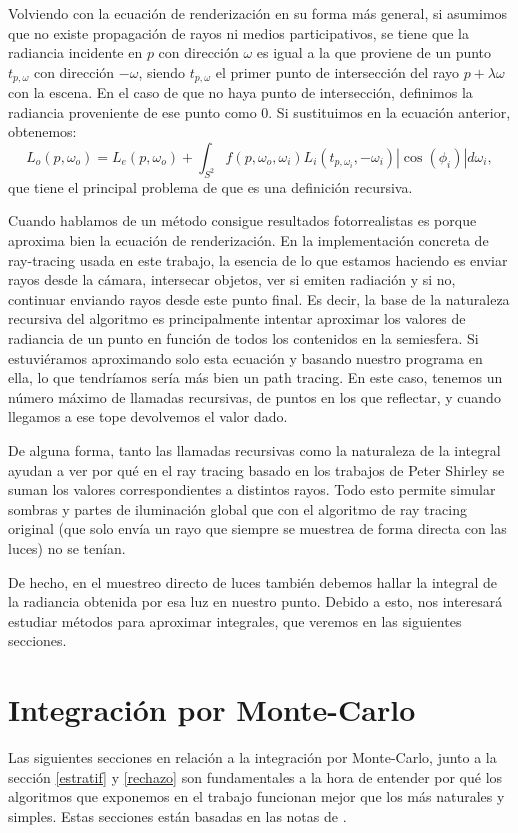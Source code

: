 \documentclass{scrbook}
\begin{document}
Volviendo con la ecuación de renderización en su forma más general, si asumimos que no existe propagación de rayos ni medios participativos, se tiene que la radiancia incidente en $p$ con dirección $\omega$ es igual a la que proviene de un punto $t_{p,\omega}$ con dirección $-\omega$, siendo $t_{p,\omega}$ el primer punto de intersección del rayo $p+\lambda \omega$ con la escena. En el caso de que no haya punto de intersección, definimos la radiancia proveniente de ese punto como $0$. Si sustituimos en la ecuación anterior, obtenemos:
$$L_o(p, \omega_o) = L_e(p, \omega_o) + \int_{S^2} f(p, \omega_o, \omega_i) L_i(t_{p,\omega_i}, -\omega_i) |\cos(\phi_i)| d\omega_i,$$
que tiene el principal problema de que es una definición recursiva.

Cuando hablamos de un método consigue resultados fotorrealistas es porque aproxima bien la ecuación de renderización. En la implementación concreta de ray-tracing usada en este trabajo, la esencia de lo que estamos haciendo es enviar rayos desde la cámara, intersecar objetos, ver si emiten radiación y si no, continuar enviando rayos desde este punto final. Es decir, la base de la naturaleza recursiva del algoritmo es principalmente intentar aproximar los valores de radiancia de un punto en función de todos los contenidos en la semiesfera. Si estuviéramos aproximando solo esta ecuación y basando nuestro programa en ella, lo que tendríamos sería más bien un path tracing. En este caso, tenemos un número máximo de llamadas recursivas, de puntos en los que reflectar, y cuando llegamos a ese tope devolvemos el valor dado. 

De alguna forma, tanto las llamadas recursivas como la naturaleza de la integral ayudan a ver por qué en el ray tracing basado en los trabajos de Peter Shirley se suman los valores correspondientes a distintos rayos. Todo esto permite simular sombras y partes de iluminación global que con el algoritmo de ray tracing original (que solo envía un rayo que siempre se muestrea de forma directa con las luces) no se tenían.

De hecho, en el muestreo directo de luces también debemos hallar la integral de la radiancia obtenida por esa luz en nuestro punto. Debido a esto, nos interesará estudiar métodos para aproximar integrales, que veremos en las siguientes secciones.
\section{Integración por Monte-Carlo}
Las siguientes secciones en relación a la integración por Monte-Carlo, junto a la sección \ref{estratif} y \ref{rechazo} son fundamentales a la hora de entender por qué los algoritmos que exponemos en el trabajo funcionan mejor que los más naturales y simples. Estas secciones están basadas en las notas de \cite{RestOfYourLife}.
\end{document}
